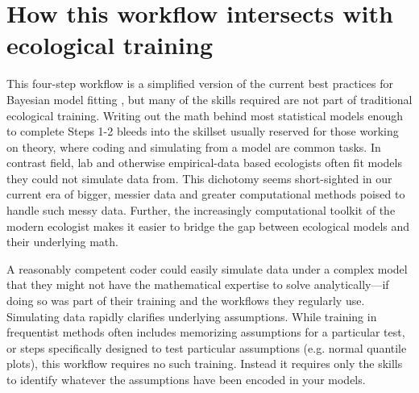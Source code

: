 \documentclass[11pt]{article}
\begin{document}

\section*{How this workflow intersects with ecological training} %

This four-step workflow is a simplified version of the current best practices for Bayesian model fitting  \citep{betanworkflow,vandeschoot2021}, but many of the skills required are not part of traditional ecological training. Writing out the math behind most statistical models enough to complete Steps 1-2 bleeds into the skillset usually reserved for those working on theory, where coding and simulating from a model are common tasks. In contrast field, lab and otherwise empirical-data based ecologists often fit models they could not simulate data from. This dichotomy seems short-sighted in our current era of bigger, messier data and greater computational methods poised to handle such messy data. Further, the increasingly computational toolkit of the modern ecologist makes it easier to bridge the gap between ecological models and their underlying math. 

A reasonably competent coder could easily simulate data under a complex model that they might not have the mathematical expertise to solve analytically---if doing so was part of their training and the workflows they regularly use. %
Simulating data rapidly clarifies underlying assumptions. While training in frequentist methods often includes memorizing assumptions for a particular test, or steps specifically designed to test particular assumptions (e.g. normal quantile plots), this workflow requires no such training. Instead it requires only the skills to identify whatever the assumptions have been encoded in your models. %
\end{document}
